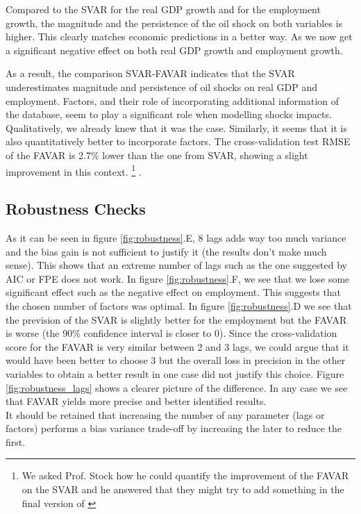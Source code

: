 \documentclass[11pt,a4paper]{article}
\begin{document}
Compared to the SVAR for the real GDP growth and for the employment growth, the magnitude and the persistence of the oil shock on both variables is higher. This clearly matches economic predictions in a better way. As we now get a significant negative effect on both real GDP growth and employment growth.

As a result, the comparison SVAR-FAVAR indicates that the SVAR underestimates magnitude and persistence of oil shocks on real GDP and employment. Factors, and their role of incorporating additional information of the database, seem to play a significant role when modelling shocks impacts. Qualitatively, we already knew that it was the case. Similarly, it seems that it is also quantitatively better to incorporate factors. The cross-validation test RMSE of the FAVAR is 2.7\% lower than the one from SVAR, showing a slight improvement in this context. \footnote{We asked Prof. Stock how he could quantify the improvement of the FAVAR on the SVAR and he answered that they might try to add something in the final version of \cite{stock2015factor}} . 



\subsection{Robustness Checks}
As it can be seen in figure \ref{fig:robustness}.E, 8 lags adds way too much variance and the bias gain is not sufficient to justify it (the results don't make much sense). This shows that an extreme number of lags such as the one suggested by AIC or FPE does not work.
In figure \ref{fig:robustness}.F, we see that we lose some significant effect such as the negative effect on employment. This suggests that the chosen number of factors was optimal. In figure \ref{fig:robustness}.D we see that the prevision of the SVAR is slightly better for the employment but the FAVAR is worse (the 90\% confidence interval is closer to 0). Since the cross-validation score for the FAVAR is very similar between 2 and 3 lags, we could argue that it would have been better to choose 3 but the overall loss in precision in the other variables to obtain a better result in one case did not justify this choice. Figure \ref{fig:robustness_lags} shows a clearer picture of the difference. In any case we see that FAVAR yields more precise and better identified results. \\
It should be retained that increasing the number of any parameter (lags or factors) performs a bias variance trade-off by increasing the later to reduce the first.
\end{document}
